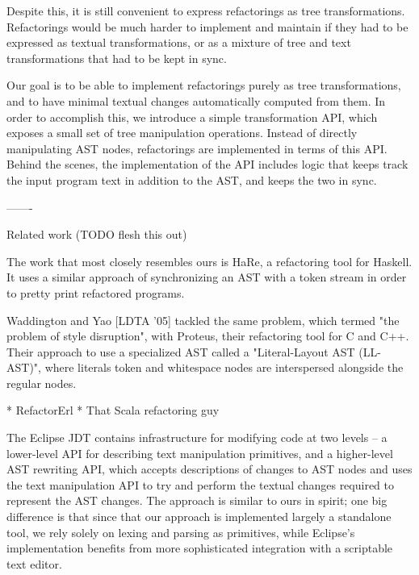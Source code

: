 Despite this, it is still convenient to express refactorings as tree
transformations. Refactorings would be much harder to implement and maintain if
they had to be expressed as textual transformations, or as a mixture of tree and
text transformations that had to be kept in sync.

Our goal is to be able to implement refactorings purely as tree transformations,
and to have minimal textual changes automatically computed from them. In order
to accomplish this, we introduce a simple transformation API, which exposes a
small set of tree manipulation operations. Instead of directly manipulating AST
nodes, refactorings are implemented in terms of this API. Behind the scenes, the
implementation of the API includes logic that keeps track the input program text
in addition to the AST, and keeps the two in sync.

-------

Related work (TODO flesh this out)

The work that most closely resembles ours is HaRe, a refactoring tool for Haskell.
It uses a similar approach of synchronizing an AST with a token stream in order
to pretty print refactored programs.

Waddington and Yao [LDTA '05] tackled the same problem, which termed "the problem
of style disruption", with Proteus, their refactoring tool for C and C++. Their
approach to use a specialized AST called a "Literal-Layout AST (LL-AST)", where
literals token and whitespace nodes are interspersed alongside the regular nodes.

* RefactorErl
* That Scala refactoring guy

The Eclipse JDT contains infrastructure for modifying code at two levels --
a lower-level API for describing text manipulation primitives, and a higher-level
AST rewriting API, which accepts descriptions of changes to AST nodes and uses the
text manipulation API to try and perform the textual changes required to represent
the AST changes. The approach is similar to ours in spirit; one big difference is
that since that our approach is implemented largely a standalone tool, we rely
solely on lexing and parsing as primitives, while Eclipse's implementation
benefits from more sophisticated integration with a scriptable text editor.
